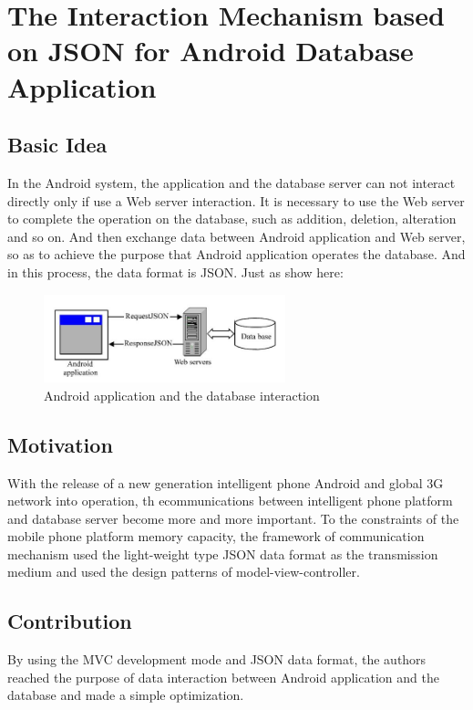 \documentclass[a4paper]{article}
\begin{document}
  \section{The Interaction Mechanism based on JSON for Android Database Application}

    \subsection{Basic Idea}
      In the Android system, the application and the database server can not interact directly only if use a Web server interaction. It is necessary to use the Web server to complete the operation on the database, such as addition, deletion, alteration and so on. And then exchange data between Android application and Web server, so as to achieve the purpose that Android application operates the database. And in this process, the data format is JSON.
      Just as show here:
      \begin{figure}[h!]
        \centering
        \includegraphics[width=7cm]{android-database-json.jpg}
        \caption{Android application and the database interaction}
        \label{fig-sample}
      \end{figure}

    \subsection{Motivation}
      With the release of a new generation intelligent phone Android and global 3G network into operation, th ecommunications between intelligent phone platform and database server become more and more important. To the constraints of the mobile phone platform memory capacity, the framework of communication mechanism used the light-weight type JSON data format as the transmission medium and used the design patterns of model-view-controller.
      
    \subsection{Contribution}
      By using the MVC development mode and JSON data format, the authors reached the purpose of data interaction between Android application and the database and made a simple optimization.
      
\end{document}
